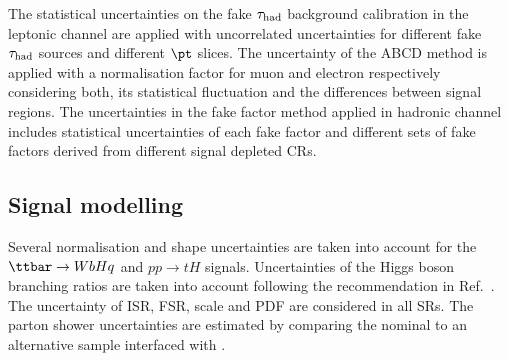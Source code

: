 The statistical uncertainties on the fake $\tau_{\mathrm{had}}$ background calibration in the leptonic channel are applied with uncorrelated uncertainties for different fake $\tau_{\mathrm{had}}$ sources and
different $\pt$ slices. The uncertainty of the ABCD method is applied with a normalisation factor for muon and electron respectively considering both,
its statistical fluctuation and the differences between signal regions.
The uncertainties in the fake factor method applied in hadronic channel includes statistical uncertainties of each fake factor and different sets of fake factors derived from different signal depleted CRs.

\subsection{Signal modelling}
\label{sec:syst_sigmodeling}

Several normalisation and shape uncertainties are taken into account for the $\Hq$ and $pp\to tH$ signals.
Uncertainties of the Higgs boson branching ratios are taken into account
following the recommendation in Ref.~\cite{deFlorian:2016spz}.
The uncertainty of ISR, FSR, scale and PDF are considered in all SRs. The parton shower uncertainties are estimated by comparing
the nominal to an alternative sample interfaced with {}.


